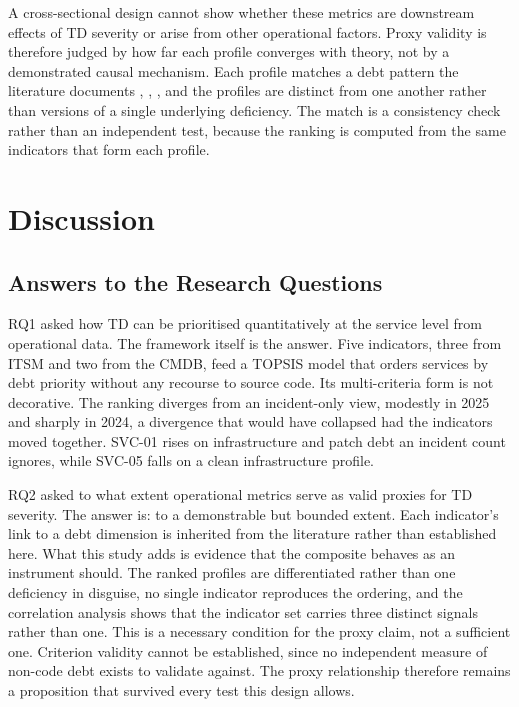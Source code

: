 \documentclass[
  journal,
]{IEEEtran}%
\begin{document}
A cross-sectional design cannot show whether these metrics are
downstream effects of TD severity or arise from other operational
factors. Proxy validity is therefore judged by how far each profile
converges with theory, not by a demonstrated causal mechanism. Each
profile matches a debt pattern the literature documents
,
,
, and the
profiles are distinct from one another rather than versions of a single
underlying deficiency. The match is a consistency check rather than an
independent test, because the ranking is computed from the same
indicators that form each profile.

\section{Discussion}\label{sec-discussion}

\subsection{Answers to the Research
Questions}\label{answers-to-the-research-questions}

RQ1 asked how TD can be prioritised quantitatively at the service level
from operational data. The framework itself is the answer. Five
indicators, three from ITSM and two from the CMDB, feed a TOPSIS model
that orders services by debt priority without any recourse to source
code. Its multi-criteria form is not decorative. The ranking diverges
from an incident-only view, modestly in 2025 and sharply in 2024, a
divergence that would have collapsed had the indicators moved together.
SVC-01 rises on infrastructure and patch debt an incident count ignores,
while SVC-05 falls on a clean infrastructure profile.

RQ2 asked to what extent operational metrics serve as valid proxies for
TD severity. The answer is: to a demonstrable but bounded extent. Each
indicator's link to a debt dimension is inherited from the literature
rather than established here. What this study adds is evidence that the
composite behaves as an instrument should. The ranked profiles are
differentiated rather than one deficiency in disguise, no single
indicator reproduces the ordering, and the correlation analysis shows
that the indicator set carries three distinct signals rather than one.
This is a necessary condition for the proxy claim, not a sufficient one.
Criterion validity cannot be established, since no independent measure
of non-code debt exists to validate against. The proxy relationship
therefore remains a proposition that survived every test this design
allows.
\end{document}
